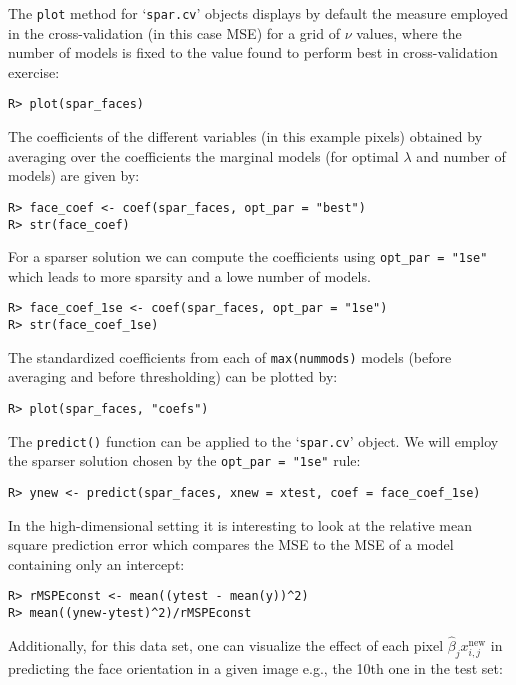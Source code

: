 \documentclass[
  article]{jss}
\begin{document}
The \texttt{plot} method for `\texttt{spar.cv}' objects displays by
default the measure employed in the cross-validation (in this case MSE)
for a grid of \(\nu\) values, where the number of models is fixed to the
value found to perform best in cross-validation exercise:

\begin{verbatim}
R> plot(spar_faces)
\end{verbatim}

The coefficients of the different variables (in this example pixels)
obtained by averaging over the coefficients the marginal models (for
optimal \(\lambda\) and number of models) are given by:

\begin{verbatim}
R> face_coef <- coef(spar_faces, opt_par = "best")
R> str(face_coef)
\end{verbatim}

For a sparser solution we can compute the coefficients using
\texttt{opt\_par\ =\ "1se"} which leads to more sparsity and a lowe
number of models.

\begin{verbatim}
R> face_coef_1se <- coef(spar_faces, opt_par = "1se")
R> str(face_coef_1se)
\end{verbatim}

The standardized coefficients from each of \texttt{max(nummods)} models
(before averaging and before thresholding) can be plotted by:

\begin{verbatim}
R> plot(spar_faces, "coefs")
\end{verbatim}

The \texttt{predict()} function can be applied to the `\texttt{spar.cv}'
object. We will employ the sparser solution chosen by the
\texttt{opt\_par\ =\ "1se"} rule:

\begin{verbatim}
R> ynew <- predict(spar_faces, xnew = xtest, coef = face_coef_1se)
\end{verbatim}

In the high-dimensional setting it is interesting to look at the
relative mean square prediction error which compares the MSE to the MSE
of a model containing only an intercept:

\begin{verbatim}
R> rMSPEconst <- mean((ytest - mean(y))^2) 
R> mean((ynew-ytest)^2)/rMSPEconst
\end{verbatim}

Additionally, for this data set, one can visualize the effect of each
pixel \(\hat\beta_j x^\text{new}_{i,j}\) in predicting the face
orientation in a given image e.g., the 10th one in the test set:
\end{document}
